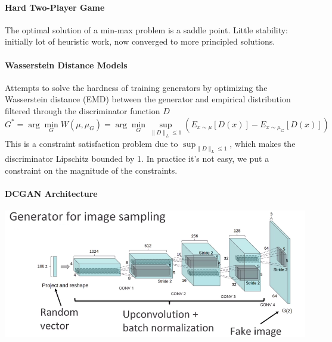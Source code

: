 \documentclass[10pt]{report}
\begin{document}
\paragraph{Hard Two-Player Game} The optimal solution of a min-max problem is a saddle point. Little stability: initially lot of heuristic work, now converged to more principled solutions.
\paragraph{Wasserstein Distance Models} Attempts to solve the hardness of training generators by optimizing the Wasserstein distance (EMD) between the generator and empirical distribution filtered through the discriminator function $D$
$$G^* = \arg\min_G W(\mu,\mu_G) = \arg\min_G\sup_{\|D\|_L\leq 1}(E_{x\sim\mu}[D(x)]-E_{x\sim\mu_G}[D(x)])$$
This is a constraint satisfaction problem due to $\sup_{\|D\|_L\leq 1}$, which makes the discriminator Lipschitz bounded by 1. In practice it's not easy, we put a constraint on the magnitude of the constraints.
\pagebreak
\paragraph{DCGAN Architecture}
\begin{center}
	\includegraphics[scale=0.5]{149.png}
\end{center}
\end{document}
